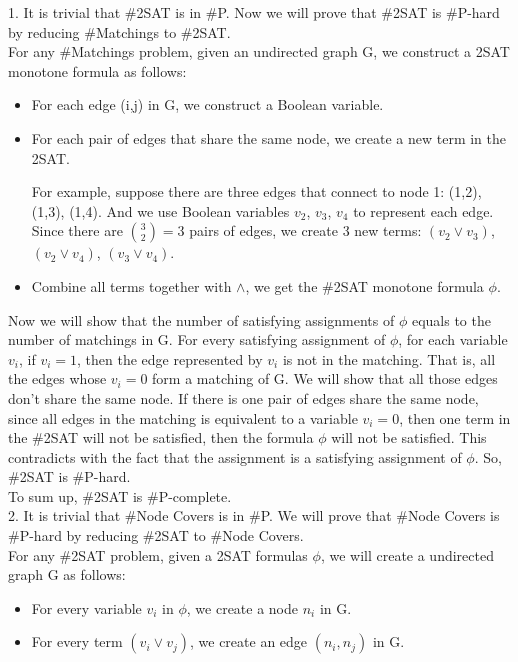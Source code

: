\documentclass[12pt]{article}
\begin{document}
1. It is trivial that \#2SAT is in \#P. Now we will prove that \#2SAT is
\#P-hard by reducing \#Matchings to \#2SAT. \\

For any \#Matchings problem, given an undirected graph G, we construct
a 2SAT monotone formula as follows:

\begin{itemize}
\item For each edge (i,j) in G, we construct a Boolean variable.
\item For each pair of edges that share the same node, we create a
  new term in the 2SAT.

  For example, suppose there are three edges that connect to node 1:
  (1,2), (1,3), (1,4). And we use Boolean variables $v_2$, $v_3$,
  $v_4$ to represent each edge. Since there are $\binom {3}{2} = 3$
  pairs of edges, we create 3 new terms: $(v_2 \lor v_3)$, $(v_2 \lor
  v_4)$, $(v_3 \lor v_4)$.
\item Combine all terms together with $\land$, we get the \#2SAT
  monotone formula $\phi$.
\end{itemize}

Now we will show that the number of satisfying assignments of $\phi$
equals to the number of matchings in G. For every satisfying
assignment of $\phi$, for each variable $v_i$, if $v_i = 1$, then the
edge represented by $v_i$ is not in the matching. That is, all the
edges whose $v_i = 0$ form a matching of G. We will show that all
those edges don't share the same node. If there is one pair of
edges share the same node, since all edges in the matching is
equivalent to a variable $v_i = 0$, then one term in the \#2SAT will
not be satisfied, then the formula $\phi$ will not be satisfied. This
contradicts with the fact that the assignment is a satisfying
assignment of $\phi$. So, \#2SAT is \#P-hard. \\

To sum up, \#2SAT is \#P-complete. \\

2. It is trivial that \#Node Covers is in \#P. We will prove that
\#Node Covers is \#P-hard by reducing \#2SAT to \#Node Covers. \\

For any \#2SAT problem, given a 2SAT formulas $\phi$, we will create
a undirected graph G as follows:

\begin{itemize}
\item For every variable $v_i$ in $\phi$, we create a node $n_i$ in G.
\item For every term $(v_i \lor v_j)$, we create an edge $(n_i, n_j)$
  in G.
\end{itemize}
\end{document}
